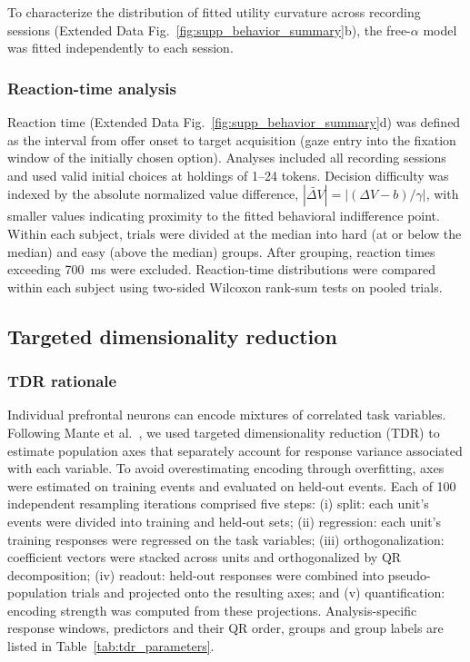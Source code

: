 \documentclass[pdflatex,sn-mathphys-num]{sn-jnl}%
\begin{document}
To characterize the distribution of fitted utility curvature across recording sessions (Extended Data Fig.~\ref{fig:supp_behavior_summary}b), the free-$\alpha$ model was fitted independently to each session.

\subsubsection{Reaction-time analysis}\label{sec:m_rt}
Reaction time (Extended Data Fig.~\ref{fig:supp_behavior_summary}d) was defined as the interval from offer onset to target acquisition (gaze entry into the fixation window of the initially chosen option). Analyses included all recording sessions and used valid initial choices at holdings of 1--24 tokens. Decision difficulty was indexed by the absolute normalized value difference, $|\widetilde{\Delta V}|=|(\Delta V-b)/\gamma|$, with smaller values indicating proximity to the fitted behavioral indifference point. Within each subject, trials were divided at the median into hard (at or below the median) and easy (above the median) groups. After grouping, reaction times exceeding 700~ms were excluded. Reaction-time distributions were compared within each subject using two-sided Wilcoxon rank-sum tests on pooled trials.

\subsection{Targeted dimensionality reduction}\label{sec:m_tdr_all}

\subsubsection{TDR rationale}\label{sec:m_tdr_principle}
Individual prefrontal neurons can encode mixtures of correlated task variables. Following Mante et al.~\cite{mante2013context}, we used targeted dimensionality reduction (TDR) to estimate population axes that separately account for response variance associated with each variable. To avoid overestimating encoding through overfitting, axes were estimated on training events and evaluated on held-out events. Each of 100 independent resampling iterations comprised five steps: (i) split: each unit's events were divided into training and held-out sets; (ii) regression: each unit's training responses were regressed on the task variables; (iii) orthogonalization: coefficient vectors were stacked across units and orthogonalized by QR decomposition; (iv) readout: held-out responses were combined into pseudo-population trials and projected onto the resulting axes; and (v) quantification: encoding strength was computed from these projections. Analysis-specific response windows, predictors and their QR order, groups and group labels are listed in Table~\ref{tab:tdr_parameters}.
\end{document}
